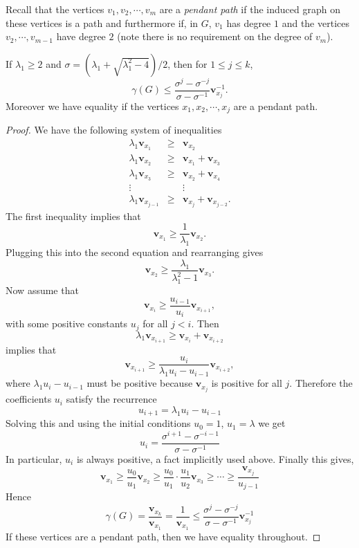 Recall that the vertices $v_1, v_2, \cdots, v_m$ are a 
\textit{pendant path} if the induced graph on these vertices
is a path and furthermore if, in $G$, $v_1$ has degree $1$ and
the vertices $v_2, \cdots, v_{m-1}$ have degree $2$
(note there is no requirement on the degree of $v_m$).

\begin{lemma}\label{path_bound}
  If $\lambda_1 \geq 2$ and $\sigma = (\lambda_1 + \sqrt{\lambda_1^2 - 4})/2$, then for
  $1 \leq j \leq k$,
   \[ \gamma(G) \leq \frac{\sigma^j - \sigma^{-j}}{\sigma - \sigma^{-1}} \mathbf{v}_{x_j}^{-1}. \]
Moreover we have equality if the vertices $x_1, x_2, \cdots, x_{j}$ are a pendant path.
  
\end{lemma}
\begin{proof}
  We have the following system of inequalities
   \begin{eqnarray*}
     \lambda_1 \mathbf{v}_{x_1} & \geq & \mathbf{v}_{x_2} \\
     \lambda_1 \mathbf{v}_{x_2} & \geq & \mathbf{v}_{x_1} + \mathbf{v}_{x_3} \\
     \lambda_1 \mathbf{v}_{x_3} & \geq & \mathbf{v}_{x_2} + \mathbf{v}_{x_4} \\
     \vdots & & \vdots\\
     \lambda_1 \mathbf{v}_{x_{j-1}} & \geq & \mathbf{v}_{x_j} + \mathbf{v}_{x_{j-2}} .
   \end{eqnarray*}
 The first inequality implies that
  \[ \mathbf{v}_{x_1} \geq \frac{1}{\lambda_1} \mathbf{v}_{x_2}.\]
 Plugging this into the second equation and rearranging gives
  \[ \mathbf{v}_{x_2} \geq \frac{\lambda_1}{\lambda_1^2 - 1} \mathbf{v}_{x_3}. \]
 Now assume that
  \[ \mathbf{v}_{x_i} \geq \frac{{u_{i-1}}}{{u_i}} \mathbf{v}_{x_{i+1}}, \]
 with some positive constants ${u_j}$ for all $j<i$.  Then
  \[ \lambda_1 \mathbf{v}_{x_{i+1}} \geq \mathbf{v}_{x_{i}} + \mathbf{v}_{x_{i+2}} \]
 implies that
 \[ \mathbf{v}_{x_{i+1}} \geq \frac{{u_i}}{\lambda_1 {u_i} - {u_{i-1}}} \mathbf{v}_{x_{i+2}}, \]
 where $\lambda_1 {u_i} - {u_{i-1}}$ must be positive because  $\mathbf{v}_{x_j}$
 is positive for all $j$.
 Therefore the coefficients $u_i$ satisfy the recurrence
  \[ u_{i+1} = \lambda_1 u_i - u_{i-1}\]
 Solving this and using the initial conditions $u_0 = 1$,
 $u_1 = \lambda$ we get
  \[ u_i = \frac{\sigma^{i+1} - \sigma^{-i-1}}{\sigma - \sigma^{-1}} \]
 In particular, $u_i$ is always positive, a fact implicitly
 used above.  Finally this gives,
  \[ \mathbf{v}_{x_1} \geq \frac{u_0}{u_1} \mathbf{v}_{x_2} \geq \frac{u_0}{u_1} \cdot \frac{u_1}{u_2} \mathbf{v}_{x_3} \geq \cdots \geq \frac{\mathbf{v}_{x_j}}{u_{j-1}} \]
 Hence
  \[ \gamma(G) = \frac{\mathbf{v}_{x_k}}{\mathbf{v}_{x_1}} = \frac{1}{\mathbf{v}_{x_1}} \leq \frac{\sigma^j - \sigma^{-j}}{\sigma - \sigma^{-1}} \mathbf{v}_{x_j}^{-1} \]
 If these vertices are a pendant path, then we have equality throughout.
\end{proof}

